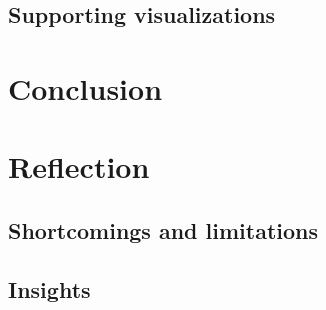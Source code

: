 \documentclass[letterpaper,10pt,english]{sphinxmanual}
\begin{document}
\section{Supporting visualizations}
\label{section3:supporting-visualizations}

\chapter{Conclusion}
\label{section4::doc}\label{section4:conclusion}

\chapter{Reflection}
\label{section5::doc}\label{section5:reflection}

\section{Shortcomings and limitations}
\label{section5:shortcomings-and-limitations}

\section{Insights}
\label{section5:insights}
\begin{thebibliography}{os4}
\end{thebibliography}



\renewcommand{\indexname}{Index}
\printindex
\end{document}

